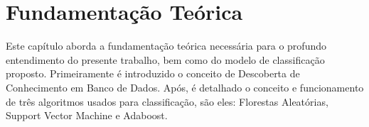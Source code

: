 \chapter{Fundamentação Teórica}
Este capítulo aborda a fundamentação teórica necessária para o profundo entendimento do presente trabalho, bem como do modelo de classificação proposto. Primeiramente é introduzido o conceito de Descoberta de Conhecimento em Banco de Dados. Após, é detalhado o conceito e funcionamento de três algoritmos usados para classificação, são eles: Florestas Aleatórias, Support Vector Machine e Adaboost. 










